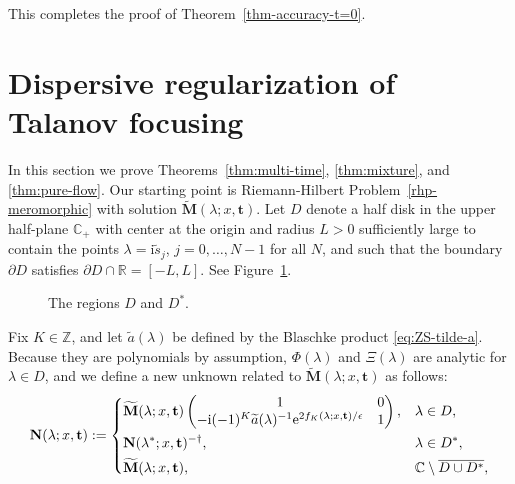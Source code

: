\documentclass[12pt]{amsart}
\numberwithin{equation}{section}
\newcommand{\ee}{\mathrm{e}}
\newcommand{\ii}{\mathrm{i}}
\newcommand{\SP}{\lambda}
\newcommand{\phaseint}{\Phi}
\newcommand{\tailint}{\Xi}
\newcommand{\C}{\mathbb{C}}
\begin{document}
This completes the proof of Theorem~\ref{thm-accuracy-t=0}.


\section{Dispersive regularization of Talanov focusing}
\label{sec-Suleimanov}
In this section we prove Theorems~\ref{thm:multi-time}, \ref{thm:mixture}, 
and \ref{thm:pure-flow}.  Our starting point is 
Riemann-Hilbert Problem~\ref{rhp-meromorphic} with solution 
$\widetilde{\mathbf{M}}(\SP;x,\mathbf{t})$.  
Let $D$ denote a half disk in the upper half-plane $\mathbb{C}_+$ with center at the origin and radius $L>0$ sufficiently large to contain the points $\SP=\ii\widetilde{s}_j$, $j=0,\dots,N-1$ for all $N$, and such that the boundary $\partial D$ satisfies $\partial D\cap\mathbb{R}=[-L,L]$.  See Figure~\ref{fig:D-regions}.  
\begin{figure}[h]
\caption{The regions $D$ and $D^*$.}
\label{fig:D-regions}
\end{figure}
Fix $K\in\mathbb{Z}$, and let $\widetilde{a}(\SP)$ be defined by the Blaschke product \eqref{eq:ZS-tilde-a}.
Because they are polynomials by assumption, $\phaseint(\SP)$ and $\tailint(\SP)$ are analytic for $\SP\in D$, and 
we define a new unknown related to $\widetilde{\mathbf{M}}(\SP;x,\mathbf{t})$ as follows:
\begin{equation}
\mathbf{N}(\SP;x,\mathbf{t}):=
\begin{dcases}
\widetilde{\mathbf{M}}(\SP;x,\mathbf{t})\begin{pmatrix} 1 & 0\\
-\ii (-1)^K \widetilde{a}(\SP)^{-1}\ee^{2f_K(\SP;x,\mathbf{t})/\epsilon} & 1\end{pmatrix}, & \SP\in D, \\
\mathbf{N}(\SP^*;x,\mathbf{t})^{-\dagger}, & \SP \in D^*, \\
\widetilde{\mathbf{M}}(\SP;x,\mathbf{t}), & \C \setminus \overline{ D \cup D^*},
\end{dcases}
\end{equation}
\end{document}
